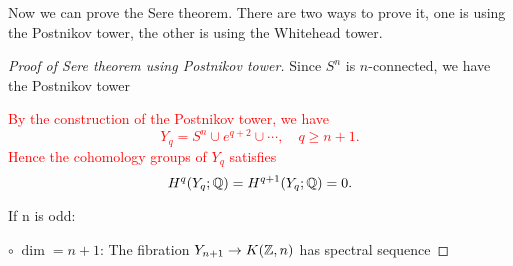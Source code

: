     Now we can prove the Sere theorem. There are two ways to prove it,
    one is using the Postnikov tower, 
    the other is using the Whitehead tower.
    \begin{proof}[Proof of Sere theorem using Postnikov tower]
        Since $S^n$ is $n$-connected, we have the Postnikov tower
        \begin{center}
        \end{center}
        \textcolor{red}{
        By the construction of the Postnikov tower, we have
        \begin{equation*}
            Y_q = S^n \cup e^{q+2} \cup \cdots,\quad q\geq n+1.
        \end{equation*}
        Hence the cohomology groups of $Y_q$ satisfies
        \begin{equation*}
            H^{q}(Y_q;\mathbb{Q}) = H^{q+1}(Y_q;\mathbb{Q}) = 0.
        \end{equation*}
        }

        \noindent If n is odd:
        
        \noindent$\circ\;\dim = n+1$: 
        The fibration $Y_{n+1} \to K(\mathbb{Z},n)$ has spectral sequence


\end{proof}
